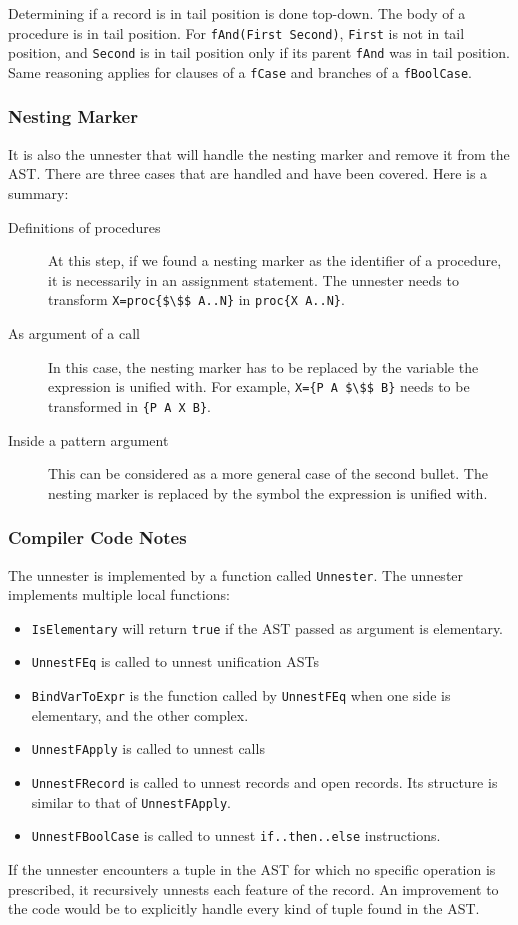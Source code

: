 \documentclass[a4paper]{memoir}
\begin{document}
Determining if a record is in tail position is done top-down.
The body of a procedure is in tail position. For \lstinline!fAnd(First Second)!,
\lstinline!First! is not in tail position, and \lstinline!Second! is in tail
position only if its parent \lstinline!fAnd! was in tail position.
Same reasoning applies for clauses of a \lstinline!fCase! and branches of a
\lstinline!fBoolCase!.



\subsubsection{Nesting Marker}\label{sec:arch:unnester:nestingmarker}
It is also the unnester that will handle the nesting marker and remove it from
the AST. There are three cases that are handled and have been covered. Here is a
summary:
\begin{description}
  \item[Definitions of procedures] At this step, if we found a nesting marker as the identifier of a procedure, it is necessarily in an assignment statement. The unnester needs to transform \lstinline[mathescape]!X=proc{$\$$ A..N}! in \lstinline!proc{X A..N}!.
  \item[As argument of a call] In this case, the nesting marker has to be
    replaced by the variable the expression is unified with. For example, \lstinline[mathescape]!X={P A $\$$ B}! needs to be transformed in  \lstinline!{P A X B}!. 
  \item[Inside a pattern argument] This can be considered as a more general case
    of the second bullet. The nesting marker is replaced by the symbol the
    expression is unified with.
\end{description}

\subsubsection{Compiler Code Notes}
The unnester is implemented by a function called \lstinline!Unnester!. The unnester implements multiple local functions:
\begin{itemize}
  \item  \lstinline!IsElementary! will return \lstinline!true! if the AST passed as argument is elementary.
  \item  \lstinline!UnnestFEq! is called to unnest unification ASTs
  \item  \lstinline!BindVarToExpr! is the function called by \lstinline!UnnestFEq! when one side is elementary, and the other complex.
  \item  \lstinline!UnnestFApply! is called to unnest calls
  \item  \lstinline!UnnestFRecord! is called to unnest records and open records. Its structure is similar to that of \lstinline!UnnestFApply!.
  \item  \lstinline!UnnestFBoolCase! is called to unnest \lstinline!if..then..else! instructions.
\end{itemize}
If the unnester encounters a tuple in the AST for which no specific operation is prescribed, it recursively unnests each feature of the record.
An improvement to the code would be to explicitly handle every kind of tuple
found in the AST.
\end{document}
